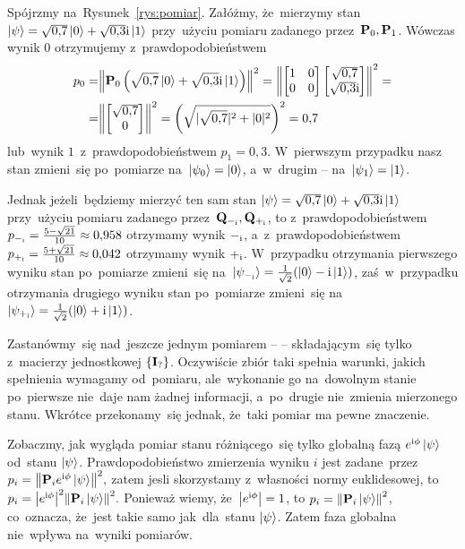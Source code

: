 Spójrzmy na~Rysunek~\ref{rys:pomiar}. Załóżmy, że~mierzymy stan
$\ket{\psi}=\sqrt{0{,}7}\ket{0}+\sqrt{0{,}3}{\mathrm i}\ket{1}$ przy~użyciu pomiaru
zadanego przez~$\mathbf{P}_0, \mathbf{P}_1$. Wówczas wynik $0$ otrzymujemy
z~prawdopodobieństwem
\begin{equation*}
	\begin{split}
		p_0=&\norm{\mathbf{P}_0\left(\sqrt{0{,}7}\ket{0}+\sqrt{0{,}3}{\mathrm i}\ket{1}\right)}^2
		=\norm{
			\begin{bmatrix} 1 & 0 \\ 0 & 0 \end{bmatrix}
			\begin{bmatrix} \sqrt{0{,}7} \\ \sqrt{0{,}3}{\mathrm i}  \end{bmatrix}
		}^2=\nonumber \\
		=&
		\norm{
			\begin{bmatrix} \sqrt{0{,}7} \\ 0  \end{bmatrix}
		}^2 = \left(\sqrt{|\sqrt{0{,}7}|^2+|0|^2}\right)^2
		=0{,}7
	\end{split}
\end{equation*}
lub~wynik $1$\ z~prawdopodobieństwem $p_1=0{,}3$. W~pierwszym przypadku nasz stan
zmieni~się po~pomiarze na~$\ket{\psi_{0}}=\ket{0}$, a~w~drugim -- na~$\ket{\psi_{1}}=\ket{1}$.

Jednak jeżeli~będziemy mierzyć ten sam stan
$\ket{\psi}=\sqrt{0{,}7}\ket{0}+\sqrt{0{,}3}{\mathrm i}\ket{1}$ przy~użyciu pomiaru
zadanego przez~$\mathbf{Q}_{-_{\mathrm i}}, \mathbf{Q}_{+_{\mathrm i}}$, to z~prawdopodobieństwem
$p_{-_{\mathrm i}}=\frac{5-\sqrt{21}}{10}\approx 0{,}958$ otrzymamy wynik $-_{\mathrm i}$,
a~z~prawdopodobieństwem $p_{+_{\mathrm i}}=\frac{5+\sqrt{21}}{10}\approx 0{,}042$ otrzymamy
wynik $+_{\mathrm i}$. W~przypadku otrzymania pierwszego wyniku stan po~pomiarze zmieni~się
na~$\ket{\psi_{-_{\mathrm i}}}=\frac{1}{\sqrt{2}}(\ket{0}-{\mathrm i} \ket{1})$, zaś~w~przypadku
otrzymania drugiego wyniku stan po~pomiarze zmieni~się
na~$\ket{\psi_{+_{\mathrm i}}}=\frac{1}{\sqrt{2}}(\ket{0}+{\mathrm i} \ket{1})$.


Zastanówmy~się nad~jeszcze jednym pomiarem --  -- składającym~się tylko z~macierzy
jednostkowej $\{\mathbf{I}_?\}$. Oczywiście zbiór taki spełnia warunki, jakich
spełnienia wymagamy od~pomiaru,
ale~wykonanie go na~dowolnym stanie po~pierwsze nie~daje nam żadnej
informacji, a~po~drugie nie~zmienia mierzonego stanu. Wkrótce przekonamy~się
jednak, że~taki pomiar ma pewne znaczenie.

Zobaczmy, jak wygląda pomiar stanu różniącego~się tylko globalną fazą
$e^{{\mathrm i}\phi}\ket{\psi}$ od~stanu $\ket{\psi}$.
Prawdopodobieństwo zmierzenia wyniku $i$ jest zadane~przez
$
	p_i=\norm{\mathbf{P}_i e^{{\mathrm i}\phi}\ket{\psi}}^2,
$
zatem jesli skorzystamy z~własności normy euklidesowej, to
$
	p_i=\abs{e^{{\mathrm i}\phi}}^2\norm{\mathbf{P}_i \ket{\psi}}^2.
$
Ponieważ wiemy, że~$\abs{e^{{\mathrm i}\phi}}=1$, to $p_i=\norm{\mathbf{P}_i \ket{\psi}}^2$,
co~oznacza, że~jest takie samo jak~dla~stanu $\ket{\psi}$. Zatem faza globalna
nie~wpływa na~wyniki pomiarów.

